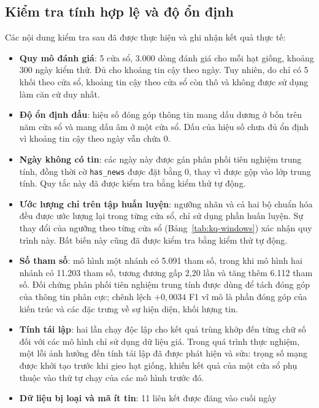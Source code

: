 \documentclass[12pt, a4paper, oneside]{report}
\begin{document}
\subsection{Kiểm tra tính hợp lệ và độ ổn định}

Các nội dung kiểm tra sau đã được thực hiện và ghi nhận kết quả thực tế:

\begin{itemize}[nosep]
  \item \textbf{Quy mô đánh giá}: 5 cửa sổ, 3.000 dòng đánh giá cho mỗi hạt giống, khoảng
        300 ngày kiểm thử. Đủ cho khoảng tin cậy theo ngày. Tuy nhiên, do chỉ
        có 5 khối theo cửa sổ, khoảng tin cậy theo cửa sổ còn thô và không được sử dụng làm
        căn cứ duy nhất.
  \item \textbf{Độ ổn định dấu}: hiệu số đóng góp thông tin mang dấu dương ở bốn trên năm
        cửa sổ và mang dấu âm ở một cửa sổ. Dấu của hiệu số chưa đủ ổn định vì khoảng tin
        cậy theo ngày vẫn chứa 0.
  \item \textbf{Ngày không có tin}: các ngày này được gán phân phối tiên nghiệm trung tính,
        đồng thời cờ \texttt{has\_news} được đặt bằng 0, thay vì được gộp vào lớp trung
        tính. Quy tắc này đã được kiểm tra bằng kiểm thử tự động.
  \item \textbf{Ước lượng chỉ trên tập huấn luyện}: ngưỡng nhãn và cả hai bộ chuẩn hóa đều
        được ước lượng lại trong từng cửa sổ, chỉ sử dụng phần huấn luyện. Sự thay đổi của
        ngưỡng theo từng cửa sổ (Bảng~\ref{tab:kq-windows}) xác nhận quy trình này. Bất biến
        này cũng đã được kiểm tra bằng kiểm thử tự động.
  \item \textbf{Số tham số}: mô hình một nhánh có 5.091 tham số, trong khi mô hình hai
        nhánh có 11.203 tham số, tương đương gấp 2,20 lần và tăng thêm 6.112 tham số. Đối
        chứng phân phối tiên nghiệm trung tính được dùng để tách đóng góp của thông tin phân
        cực; chênh lệch $+0{,}0034$ F1 vĩ mô là phần đóng góp của kiến trúc và các đặc trưng
        về sự hiện diện, khối lượng tin.
  \item \textbf{Tính tái lập}: hai lần chạy độc lập cho kết quả trùng khớp đến từng chữ số
        đối với các mô hình chỉ sử dụng dữ liệu giá. Trong quá trình thực nghiệm, một lỗi
        ảnh hưởng đến tính tái lập đã được phát hiện và sửa: trọng số mạng được khởi tạo
        trước khi gieo hạt giống, khiến kết quả của một cửa sổ phụ thuộc vào thứ tự chạy của
        các mô hình trước đó.
  \item \textbf{Dữ liệu bị loại và mã ít tin}: 11 liên kết được đăng vào cuối ngày

\end{itemize}
\end{document}
